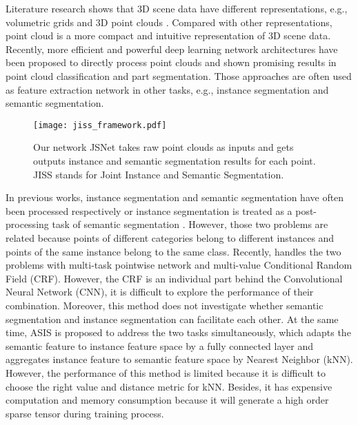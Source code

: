 \documentclass[letterpaper]{article} \usepackage{aaai20}  \usepackage{times}  \usepackage{helvet} \usepackage{courier}  \usepackage[hyphens]{url}  \usepackage{graphicx} \urlstyle{rm} \def\UrlFont{\rm}  \usepackage{graphicx}  \frenchspacing  \setlength{\pdfpagewidth}{8.5in}  \setlength{\pdfpageheight}{11in}
\begin{document}
Literature research shows that 3D scene data have different representations, e.g., volumetric grids \cite{Wu_2015_CVPR,Nguyen_2016_CVPR,maturana2015voxnet} and 3D point clouds \cite{qi2017pointnet++,li2018pointcnn,wang2018dynamic,yu2018pu}. Compared with other representations, point cloud is a more compact and intuitive representation of 3D scene data. Recently, more efficient and powerful deep learning network architectures \cite{qi2017pointnet++,wu2018pointconv,Li_2018_CVPR} have been proposed to directly process point clouds and shown promising results in point cloud classification and part segmentation. Those approaches are often used as feature extraction network in other tasks, e.g., instance segmentation and semantic segmentation.

\begin{figure}[t]
	\centering
	\texttt{[image: jiss\_framework.pdf]}
	\caption{Our network JSNet takes raw point clouds as inputs and gets outputs instance and semantic segmentation results for each point. JISS stands for Joint Instance and Semantic Segmentation.}
	\label{fig:network_framework}
\end{figure}

In previous works, instance segmentation and semantic segmentation have often been processed respectively or instance segmentation is treated as a post-processing task of semantic segmentation \cite{Wang_2018_CVPR,pham2019real}. However, those two problems are related because points of different categories belong to different instances and points of the same instance belong to the same class. Recently, \cite{Pham_2019_CVPR} handles the two problems with multi-task pointwise network and multi-value Conditional Random Field (CRF). However, the CRF is an individual part behind the Convolutional Neural Network (CNN), it is difficult to explore the performance of their combination. Moreover, this method does not investigate whether semantic segmentation and instance segmentation can facilitate each other. At the same time, ASIS \cite{Wang_2019_CVPR} is proposed to address the two tasks simultaneously, which adapts  the semantic feature to instance feature space by a fully connected layer and aggregates instance feature to semantic feature space by  Nearest Neighbor (kNN). However, the performance of this method is limited because it is difficult to choose the right  value and distance metric for kNN. Besides, it has expensive computation and memory consumption because it will generate a high order sparse tensor during training process. 
\end{document}
